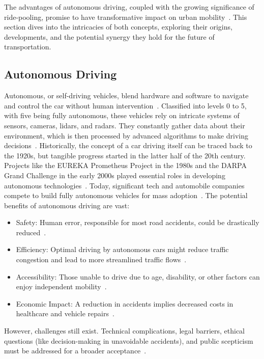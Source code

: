  The advantages of autonomous driving, coupled with the growing significance of ride-pooling, promise to have transformative impact on urban mobility~\cite{Stamadianos.2023}. This section dives into the intricacies of both concepts, exploring their origins, developments, and the potential synergy they hold for the future of transportation.

\subsection{Autonomous Driving}
Autonomous, or self-driving vehicles, blend hardware and software to navigate and control the car without human intervention~\cite{Stamadianos.2023}. Classified into levels 0 to 5, with five being fully autonomous, these vehicles rely on intricate systems of sensors, cameras, lidars, and radars. They constantly gather data about their environment, which is then processed by advanced algorithms to make driving decisions~\cite{Hacohen.2022}.
Historically, the concept of a car driving itself can be traced back to the 1920s, but tangible progress started in the latter half of the 20th century. Projects like the EUREKA Prometheus Project in the 1980s and the DARPA Grand Challenge in the early 2000s played essential roles in developing autonomous technologies~\cite{Hacohen.2022}. Today, significant tech and automobile companies compete to build fully autonomous vehicles for mass adoption~\cite{Stamadianos.2023}.
The potential benefits of autonomous driving are vast:
\begin{itemize}
    \item Safety: Human error, responsible for most road accidents, could be drastically reduced~\cite{Hacohen.2022}.
    \item Efficiency: Optimal driving by autonomous cars might reduce traffic congestion and lead to more streamlined traffic flows~\cite{Stamadianos.2023}.
    \item Accessibility: Those unable to drive due to age, disability, or other factors can enjoy independent mobility~\cite{Hacohen.2022}.
    \item Economic Impact: A reduction in accidents implies decreased costs in healthcare and vehicle repairs~\cite{Stamadianos.2023}.
\end{itemize}

However, challenges still exist. Technical complications, legal barriers, ethical questions (like decision-making in unavoidable accidents), and public scepticism must be addressed for a broader acceptance~\cite{Hacohen.2022}.

